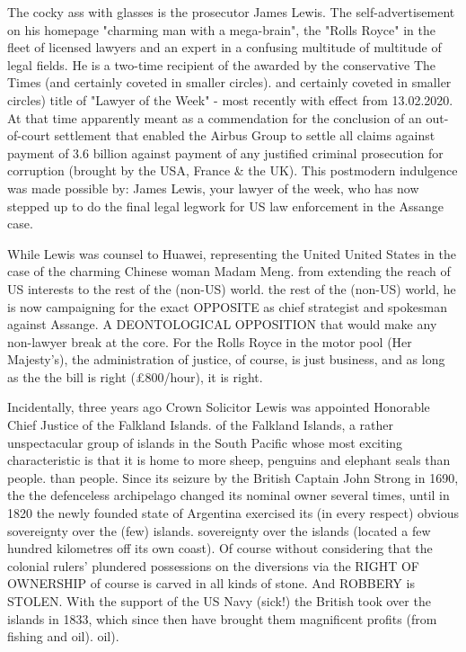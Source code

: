 \begin{multicols}{2}
The cocky ass with glasses is the prosecutor James
Lewis. The self-advertisement on his homepage
"charming man with a mega-brain", the "Rolls Royce" in the fleet of licensed
lawyers and an expert in a confusing multitude of
multitude of legal fields. He is a two-time recipient of the
awarded by the conservative The Times (and certainly coveted in smaller circles).
and certainly coveted in smaller circles) title of "Lawyer of the Week" - most recently with effect from 13.02.2020.
At that time apparently meant as a commendation for the conclusion of an out-of-court settlement that enabled the
Airbus Group to settle all claims against payment of
3.6 billion against payment of any justified criminal prosecution for
corruption (brought by the USA, France \& the UK). This postmodern indulgence was made possible by:
James Lewis, your lawyer of the week, who has now stepped up to do the final legal legwork for US law enforcement in the Assange case.

While Lewis was counsel to Huawei, representing the United
United States in the case of the charming Chinese woman Madam Meng.
from extending the reach of US interests to the rest of the (non-US) world.
the rest of the (non-US) world,
he is now campaigning for the exact OPPOSITE as chief strategist and spokesman against Assange. A DEONTOLOGICAL OPPOSITION that would make any non-lawyer break at the core. For the Rolls
Royce in the motor pool (Her Majesty's), the administration of justice, of course, is just business, and as long as the
the bill is right (£800/hour), it is right.

Incidentally, three years ago Crown Solicitor Lewis was appointed
Honorable Chief Justice of the Falkland Islands.
of the Falkland Islands, a rather unspectacular group of islands in the South Pacific whose most exciting characteristic is that it is home to more sheep, penguins and elephant seals than people.
than people. Since its seizure
by the British Captain John Strong in 1690, the
the defenceless archipelago changed its nominal owner several times, until in 1820 the newly founded state of Argentina exercised its (in every respect) obvious sovereignty over the (few) islands.
sovereignty over the islands (located a few hundred kilometres off its own coast). Of course
without considering that the colonial rulers' plundered possessions
on the diversions via the RIGHT OF OWNERSHIP of course
is carved in all kinds of stone. And ROBBERY is
STOLEN. With the support of the US Navy (sick!)
the British took over the islands in 1833, which since then have brought them magnificent profits (from fishing and oil).
oil).


\end{multicols}
